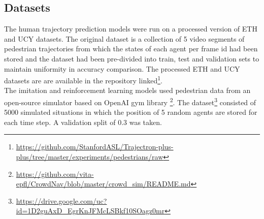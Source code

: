 {\subsection{Datasets}
The human trajectory prediction models were run on a processed version of ETH and UCY datasets. The original dataset is a collection of 5 video segments of pedestrian trajectories from which the states of each agent per frame id had been stored and the dataset had been pre-divided into train, test and validation sets to maintain uniformity in accuracy comparison. The processed ETH and UCY datasets are are available in the repository linked\footnote{\href{https://github.com/StanfordASL/Trajectron-plus-plus/tree/master/experiments/pedestrians/raw}{https://github.com/StanfordASL/Trajectron-plus-plus/tree/master/experiments/pedestrians/raw}}.\\
The imitation and reinforcement learning models used pedestrian data from an open-source simulator based on OpenAI gym library \footnote{\href{https://github.com/vita-epfl/CrowdNav/blob/master/crowd_sim/README.md}{https://github.com/vita-epfl/CrowdNav/blob/master/crowd_sim/README.md}}. The dataset\footnote{\href{https://drive.google.com/uc?id=1D2guAxD_EgrKnJFMcLSBkf10SOagz0mr}{https://drive.google.com/uc?id=1D2guAxD_EgrKnJFMcLSBkf10SOagz0mr}} consisted of 5000 simulated situations in which the position of 5 random agents are stored for each time step. A validation split of 0.3 was taken. 

}
